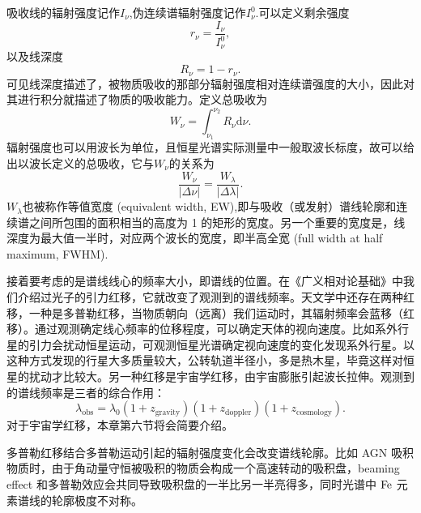 \documentclass[../天体物理基础.tex]{subfiles}
\begin{document}
吸收线的辐射强度记作$I_{\nu}$,伪连续谱辐射强度记作$I_{\nu}^{0}$.可以定义剩余强度
\begin{equation}
r_{\nu}=\frac{I_{\nu}}{I_{\nu}^{0}},
\end{equation}
以及线深度
\begin{equation}
R_{\nu}=1-r_{\nu}.
\end{equation}
可见线深度描述了，被物质吸收的那部分辐射强度相对连续谱强度的大小，因此对其进行积分就描述了物质的吸收能力。定义总吸收为
\begin{equation}
W_{\nu}=\int_{\nu_{1}}^{\nu_{2}}R_{\nu}\mathrm{d}\nu.
\end{equation}
辐射强度也可以用波长为单位，且恒星光谱实际测量中一般取波长标度，故可以给出以波长定义的总吸收，它与$W_{\nu}$的关系为
\begin{equation}
\frac{W_{\nu}}{\left\vert{}\Delta{}\nu\right\vert{}}=\frac{W_{\lambda}}{\left\vert{}\Delta{}\lambda\right\vert{}}.
\end{equation}
$W_{\lambda}$也被称作等值宽度 (equivalent width, EW),即与吸收（或发射）谱线轮廓和连续谱之间所包围的面积相当的高度为 1 的矩形的宽度。另一个重要的宽度是，线深度为最大值一半时，对应两个波长的宽度，即半高全宽 (full width at half maximum, FWHM).

接着要考虑的是谱线线心的频率大小，即谱线的位置。在《广义相对论基础》中我们介绍过光子的引力红移，它就改变了观测到的谱线频率。天文学中还存在两种红移，一种是多普勒红移，当物质朝向（远离）我们运动时，其辐射频率会蓝移（红移）。通过观测确定线心频率的位移程度，可以确定天体的视向速度。比如系外行星的引力会扰动恒星运动，可观测恒星光谱确定视向速度的变化发现系外行星。以这种方式发现的行星大多质量较大，公转轨道半径小，多是热木星，毕竟这样对恒星的扰动才比较大。另一种红移是宇宙学红移，由宇宙膨胀引起波长拉伸。观测到的谱线频率是三者的综合作用：
\begin{equation}
\lambda_{\text{obs}}=\lambda_{0}\left(1+z_{\text{gravity}}\right)\left(1+z_{\text{doppler}}\right)\left(1+z_{\text{cosmology}}\right).
\end{equation}
对于宇宙学红移，本章第六节将会简要介绍。

多普勒红移结合多普勒运动引起的辐射强度变化会改变谱线轮廓。比如 AGN 吸积物质时，由于角动量守恒被吸积的物质会构成一个高速转动的吸积盘，beaming effect 和多普勒效应会共同导致吸积盘的一半比另一半亮得多，同时光谱中 $\ce{Fe}$ 元素谱线的轮廓极度不对称。
\end{document}
